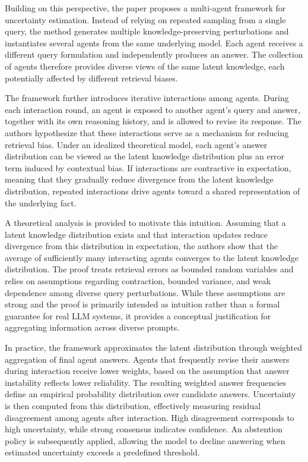 Building on this perspective, the paper proposes a multi-agent framework for uncertainty estimation. Instead of relying on repeated sampling from a single query, the method generates multiple knowledge-preserving perturbations and instantiates several agents from the same underlying model. Each agent receives a different query formulation and independently produces an answer. The collection of agents therefore provides diverse views of the same latent knowledge, each potentially affected by different retrieval biases.

The framework further introduces iterative interactions among agents. During each interaction round, an agent is exposed to another agent's query and answer, together with its own reasoning history, and is allowed to revise its response. The authors hypothesize that these interactions serve as a mechanism for reducing retrieval bias. Under an idealized theoretical model, each agent's answer distribution can be viewed as the latent knowledge distribution plus an error term induced by contextual bias. If interactions are contractive in expectation, meaning that they gradually reduce divergence from the latent knowledge distribution, repeated interactions drive agents toward a shared representation of the underlying fact.

A theoretical analysis is provided to motivate this intuition. Assuming that a latent knowledge distribution exists and that interaction updates reduce divergence from this distribution in expectation, the authors show that the average of sufficiently many interacting agents converges to the latent knowledge distribution. The proof treats retrieval errors as bounded random variables and relies on assumptions regarding contraction, bounded variance, and weak dependence among diverse query perturbations. While these assumptions are strong and the proof is primarily intended as intuition rather than a formal guarantee for real LLM systems, it provides a conceptual justification for aggregating information across diverse prompts.

In practice, the framework approximates the latent distribution through weighted aggregation of final agent answers. Agents that frequently revise their answers during interaction receive lower weights, based on the assumption that answer instability reflects lower reliability. The resulting weighted answer frequencies define an empirical probability distribution over candidate answers. Uncertainty is then computed from this distribution, effectively measuring residual disagreement among agents after interaction. High disagreement corresponds to high uncertainty, while strong consensus indicates confidence. An abstention policy is subsequently applied, allowing the model to decline answering when estimated uncertainty exceeds a predefined threshold.

